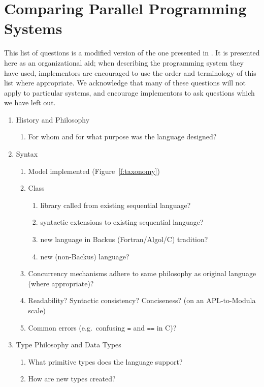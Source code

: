 \section{Comparing Parallel Programming Systems\label{s:questions}}

This list of questions is a modified version of the one presented in \cite{b:compare-ada-c-pascal}.
It is presented here as an organizational aid;
when describing the programming system they have used,
implementors are encouraged to use the order and terminology of this list where appropriate.
We acknowledge that many of these questions will not apply to particular systems,
and encourage implementors to ask questions which we have left out.

\begin{enumerate}
\item History and Philosophy
  \begin{enumerate}
  \item For whom and for what purpose was the language designed?
  \end{enumerate}
\item Syntax
  \begin{enumerate}
  \item Model implemented (Figure~\ref{f:taxonomy})
  \item Class
    \begin{enumerate}
    \item library called from existing sequential language?
    \item syntactic extensions to existing sequential language?
    \item new language in Backus (Fortran/Algol/C) tradition?
    \item new (non-Backus) language?
    \end{enumerate}
  \item Concurrency mechanisms adhere to same philosophy as original
	language (where appropriate)?
  \item Readability?  Syntactic consistency?  Conciseness?
	(on an APL-to-Modula scale)
  \item Common errors (e.g.\ confusing {\tt{=}} and {\tt{==}} in C)?
  \end{enumerate}
\item Type Philosophy and Data Types
  \begin{enumerate}
  \item What primitive types does the language support?
  \item How are new types created?

\end{enumerate}
\end{enumerate}
